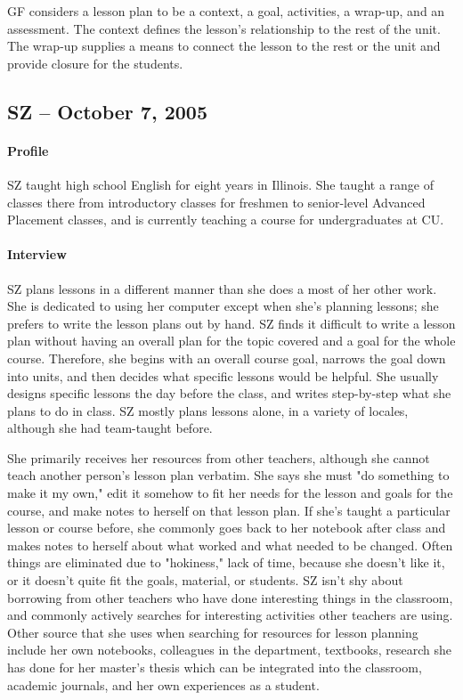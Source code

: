 \documentclass[12pt,titlepage]{article}
\begin{document}
GF considers a lesson plan to be a context, a goal, activities, a wrap-up, and
an assessment. The context defines the lesson's relationship to the rest of the
unit. The wrap-up supplies a means to connect the lesson to the rest or the unit
and provide closure for the students.

\subsection{SZ -- October 7, 2005}
\paragraph{Profile} SZ taught high school English for eight years in Illinois.
She taught a range of classes there from introductory classes for freshmen to
senior-level Advanced Placement classes, and is currently teaching a course for
undergraduates at CU.

\paragraph{Interview}SZ plans lessons in a different manner than she does a most
of her other work.  She is dedicated to using her computer except when she's
planning lessons; she prefers to write the lesson plans out by hand.  SZ finds
it difficult to write a lesson plan without having an overall plan for the topic
covered and a goal for the whole course.  Therefore, she begins with an overall
course goal, narrows the goal down into units, and then decides what specific
lessons would be helpful. She usually designs specific lessons the day before
the class, and writes step-by-step what she plans to do in class. SZ mostly
plans lessons alone, in a variety of locales, although she had team-taught
before.

She primarily receives her resources from other teachers, although she cannot
teach another person's lesson plan verbatim.  She says she must "do something to
make it my own," edit it somehow to fit her needs for the lesson and goals for
the course, and make notes to herself on that lesson plan.  If she's taught a
particular lesson or course before, she commonly goes back to her notebook after
class and makes notes to herself about what worked and what needed to be
changed.  Often things are eliminated due to "hokiness," lack of time, because
she doesn't like it, or it doesn't quite fit the goals, material, or students.
SZ isn't shy about borrowing from other teachers who have done interesting
things in the classroom, and commonly actively searches for interesting
activities other teachers are using.  Other source that she uses when searching
for resources for lesson planning include her own notebooks, colleagues in the
department, textbooks, research she has done for her master's thesis which can
be integrated into the classroom, academic journals, and her own experiences as
a student.
\end{document}
